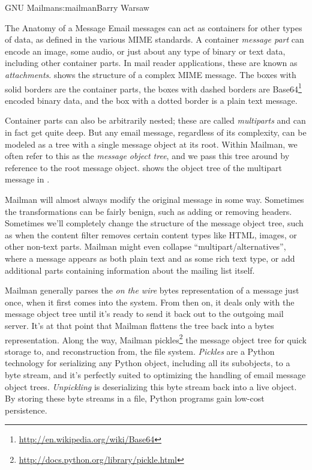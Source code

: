 \begin{aosachapter}{GNU Mailman}{s:mailman}{Barry Warsaw}
\begin{aosasect1}{The Anatomy of a Message}
Email messages can act as containers for other types of data, as
defined in the various MIME standards.  A container \emph{message
  part} can encode an image, some audio, or just about any type of
binary or text data, including other container parts.  In mail reader applications, these are known as
\emph{attachments}.   shows the structure
of a complex MIME message.  The boxes with solid borders are the container parts,
the boxes with dashed borders are
Base64\footnote{\url{http://en.wikipedia.org/wiki/Base64}} encoded
binary data, and the box with a dotted border is a plain text message.


Container parts can also be arbitrarily nested; these are called
\emph{multiparts} and can in fact get quite deep.  But any email
message, regardless of its complexity, can be modeled as a tree with
a single message object at its root.  Within Mailman, we often refer
to this as the \emph{message object tree}, and we pass this tree
around by reference to the root message object.
 shows the object tree of the
multipart message in .


Mailman will almost always modify the original message in some way.
Sometimes the transformations can be fairly benign, such as adding or
removing headers.  Sometimes we'll completely change the structure of
the message object tree, such as when the content filter removes
certain content types like HTML, images, or other non-text parts.
Mailman might even collapse ``multipart/alternatives'', where a message
appears as both plain text and as some rich text type, or add
additional parts containing information about the mailing list itself.

Mailman generally parses the \emph{on the wire} bytes representation
of a message just once, when it first comes into the system.  From
then on, it deals only with the message object tree until it's ready
to send it back out to the outgoing mail server.  It's at that point
that Mailman flattens the tree back into a bytes representation.
Along the way, Mailman
pickles\footnote{\url{http://docs.python.org/library/pickle.html}} the
message object tree for quick storage to, and reconstruction from, the
file system.  \emph{Pickles} are a Python technology for serializing
any Python object, including all its subobjects, to a byte stream, and
it's perfectly suited to optimizing the handling of email message
object trees. \emph{Unpickling} is deserializing this byte stream back
into a live object.  By storing these byte streams in a file, Python
programs gain low-cost persistence.


\end{aosasect1}
\end{aosachapter}
